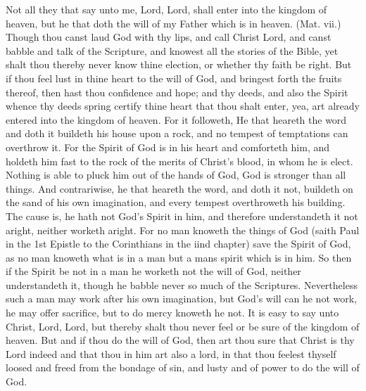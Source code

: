Not all they that say unto me, Lord, Lord, shall enter into
the kingdom of heaven, but he that doth the will of 
my Father which is in heaven. (Mat. vii.) Though thou 
canst laud God with thy lips, and call Christ Lord, and 
canst babble and talk of the Scripture, and knowest all the 
stories of the Bible, yet shalt thou thereby never know 
thine election, or whether thy faith be right. But if thou 
feel lust in thine heart to the will of God, and bringest 
forth the fruits thereof, then hast thou confidence and hope; 
and thy deeds, and also the Spirit whence thy deeds spring 
certify thine heart that thou shalt enter, yea, art already 
entered into the kingdom of heaven. For it followeth, 
He that heareth the word and doth it buildeth his house 
upon a rock, and no tempest of temptations can overthrow
it. For the Spirit of God is in his heart and comforteth
him, and holdeth him fast to the rock of the 
merits of Christ's blood, in whom he is elect. Nothing 
is able to pluck him out of the hands of God, God is 
stronger than all things. And contrariwise, he that 
heareth the word, and doth it not, buildeth on the sand of 
his own imagination, and every tempest overthroweth his 
building. The cause is, he hath not God's Spirit in him, 
and therefore understandeth it not aright, neither worketh 
aright. For no man knoweth the things of God (saith 
Paul in the 1st Epistle to the Corinthians in the iind chapter)
save the Spirit of God, as no man knoweth what is in 
a man but a mans spirit which is in him. So then if the 
Spirit be not in a man he worketh not the will of God, 
neither understandeth it, though he babble never so much 
of the Scriptures. Nevertheless such a man may work after 
his own imagination, but God's will can he not work, he 
may offer sacrifice, but to do mercy knoweth he not. It is 
easy to say unto Christ, Lord, Lord, but thereby shalt thou 
never feel or be sure of the kingdom of heaven. But and if 
thou do the will of God, then art thou sure that Christ is 
thy Lord indeed and that thou in him art also a lord, in 
that thou feelest thyself loosed and freed from the bondage 
of sin, and lusty and of power to do the will of God. 

